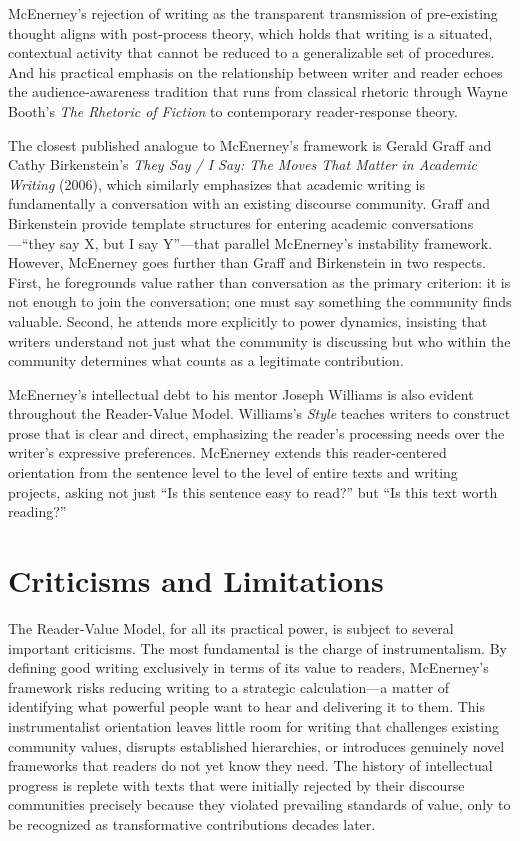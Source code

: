 \documentclass[12pt]{article}
\begin{document}
McEnerney's rejection of writing as the transparent transmission of pre-existing thought aligns with post-process theory, which holds that writing is a situated, contextual activity that cannot be reduced to a generalizable set of procedures. And his practical emphasis on the relationship between writer and reader echoes the audience-awareness tradition that runs from classical rhetoric through Wayne Booth's \textit{The Rhetoric of Fiction} to contemporary reader-response theory.

The closest published analogue to McEnerney's framework is Gerald Graff and Cathy Birkenstein's \textit{They Say / I Say: The Moves That Matter in Academic Writing} (2006), which similarly emphasizes that academic writing is fundamentally a conversation with an existing discourse community. Graff and Birkenstein provide template structures for entering academic conversations---``they say X, but I say Y''---that parallel McEnerney's instability framework. However, McEnerney goes further than Graff and Birkenstein in two respects. First, he foregrounds value rather than conversation as the primary criterion: it is not enough to join the conversation; one must say something the community finds valuable. Second, he attends more explicitly to power dynamics, insisting that writers understand not just what the community is discussing but who within the community determines what counts as a legitimate contribution.

McEnerney's intellectual debt to his mentor Joseph Williams is also evident throughout the Reader-Value Model. Williams's \textit{Style} teaches writers to construct prose that is clear and direct, emphasizing the reader's processing needs over the writer's expressive preferences. McEnerney extends this reader-centered orientation from the sentence level to the level of entire texts and writing projects, asking not just ``Is this sentence easy to read?'' but ``Is this text worth reading?''

\section*{Criticisms and Limitations}

The Reader-Value Model, for all its practical power, is subject to several important criticisms. The most fundamental is the charge of instrumentalism. By defining good writing exclusively in terms of its value to readers, McEnerney's framework risks reducing writing to a strategic calculation---a matter of identifying what powerful people want to hear and delivering it to them. This instrumentalist orientation leaves little room for writing that challenges existing community values, disrupts established hierarchies, or introduces genuinely novel frameworks that readers do not yet know they need. The history of intellectual progress is replete with texts that were initially rejected by their discourse communities precisely because they violated prevailing standards of value, only to be recognized as transformative contributions decades later.
\end{document}

